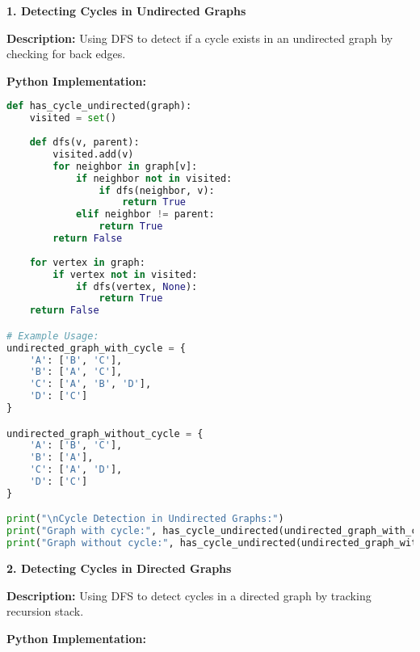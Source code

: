 \textbf{1. Detecting Cycles in Undirected Graphs}

\textbf{Description:}  
Using DFS to detect if a cycle exists in an undirected graph by checking for back edges.

\textbf{Python Implementation:}

\begin{lstlisting}[language=Python, xleftmargin=0.02\textwidth, xrightmargin=0.02\textwidth]
def has_cycle_undirected(graph):
    visited = set()
    
    def dfs(v, parent):
        visited.add(v)
        for neighbor in graph[v]:
            if neighbor not in visited:
                if dfs(neighbor, v):
                    return True
            elif neighbor != parent:
                return True
        return False
    
    for vertex in graph:
        if vertex not in visited:
            if dfs(vertex, None):
                return True
    return False

# Example Usage:
undirected_graph_with_cycle = {
    'A': ['B', 'C'],
    'B': ['A', 'C'],
    'C': ['A', 'B', 'D'],
    'D': ['C']
}

undirected_graph_without_cycle = {
    'A': ['B', 'C'],
    'B': ['A'],
    'C': ['A', 'D'],
    'D': ['C']
}

print("\nCycle Detection in Undirected Graphs:")
print("Graph with cycle:", has_cycle_undirected(undirected_graph_with_cycle))  # Output: True
print("Graph without cycle:", has_cycle_undirected(undirected_graph_without_cycle))  # Output: False
\end{lstlisting}

\textbf{2. Detecting Cycles in Directed Graphs}

\textbf{Description:}  
Using DFS to detect cycles in a directed graph by tracking recursion stack.

\textbf{Python Implementation:}

